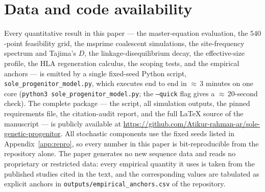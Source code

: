 \section*{Data and code availability}

Every quantitative result in this paper --- the master-equation
evaluation, the $540$-point feasibility grid, the msprime coalescent
simulations, the site-frequency spectrum and Tajima's $D$, the
linkage-disequilibrium decay, the effective-size profile, the HLA
regeneration calculus, the scoping tests, and the empirical anchors --- is
emitted by a single fixed-seed Python script,
\texttt{sole\_progenitor\_model.py}, which executes end to end in
${\approx}\,3$ minutes on one core (\texttt{python3
sole\_progenitor\_model.py}; the \texttt{--quick} flag gives a
${\approx}\,20$-second check). The complete package --- the script, all
simulation outputs, the pinned requirements file, the citation-audit
report, and the full \LaTeX{} source of the manuscript --- is publicly
available at
\url{https://github.com/Atikur-rahman-ar/sole-genetic-progenitor}. All
stochastic components use the fixed seeds listed in
Appendix~\ref{app:repro}, so every number in this paper is
bit-reproducible from the repository alone. The paper generates no new
sequence data and reads no proprietary or restricted data: every empirical
quantity it uses is taken from the published studies cited in the text,
and the corresponding values are tabulated as explicit anchors in
\texttt{outputs/empirical\_anchors.csv} of the repository.

